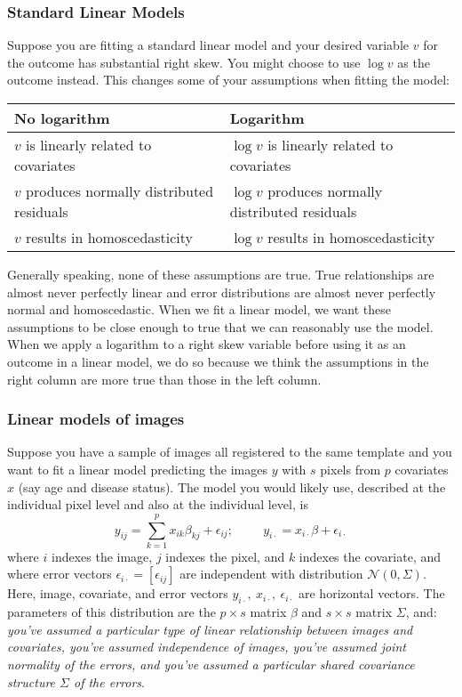 \documentclass[12pt]{article}
\begin{document}
\subsubsection*{Standard Linear Models}
Suppose you are fitting a standard linear model and your desired variable $v$ for the outcome has substantial right skew. You might choose to use $\log v$ as the outcome instead. This changes some of your assumptions when fitting the model:

\small
\begin{tabular}{l|l}
No logarithm & Logarithm\\ \hline
$v$ is linearly related to covariates & $\log v$ is linearly related to covariates\\
$v$ produces normally distributed residuals & $\log v$  produces normally distributed residuals\\
$v$ results in homoscedasticity & $\log v$  results in homoscedasticity
\end{tabular}\normalsize

Generally speaking, none of these assumptions are true. True relationships are almost never perfectly linear and error distributions are almost never perfectly normal and homoscedastic. When we fit a linear model, we want these assumptions to be close enough to true that we can reasonably use the model. When we apply a logarithm to a right skew variable before using it as an outcome in a linear model, we do so because we think the assumptions in the right column are more true than those in the left column.

\subsubsection*{Linear models of images}

Suppose you have a sample of images all registered to the same template and you want to fit a linear model predicting the images $y$ with $s$ pixels from $p$ covariates $x$ (say age and disease status). The model you would likely use, described at the individual pixel level and also at the individual level, is
$$y_{ij}=\sum_{k=1}^p x_{ik}\beta_{kj}+\epsilon_{ij};
\hspace{1cm}
y_{i\cdot}=x_{i\cdot}\beta+\epsilon_{i\cdot}$$
where $i$ indexes the image, $j$ indexes the pixel, and $k$ indexes the covariate, and where error vectors $\epsilon_{i\cdot}=[\epsilon_{ij}]$ are independent with distribution $\mathcal N(0,\Sigma)$. Here, image, covariate, and error vectors $y_{i\cdot},\ x_{i\cdot},\ \epsilon_{i\cdot}$ are horizontal vectors. The parameters of this distribution are the $p\times s$ matrix $\beta$ and $s\times s$ matrix $\Sigma$, and: \textit{you've assumed a particular type of linear relationship between images and covariates, you've assumed independence of images, you've assumed joint normality of the errors, and you've assumed a particular shared covariance structure $\Sigma$ of the errors}.
\end{document}
